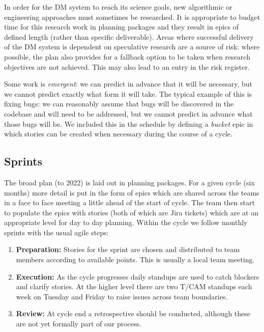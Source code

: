 In order for the DM system to reach its science goals, new algorithmic or engineering approaches must sometimes be researched.
It is appropriate to budget time for this research work in planning packages and they result in epics of defined length (rather than specific  deliverable).
Areas where successful delivery of the DM system is dependent on speculative research are a source of risk: where possible, the plan  also provides for a fallback option to be taken when research objectives are not achieved.
This may also lead to an entry in the risk register.\cite{2016SPIE.9911E..0NK}


Some work is \emph{emergent}: we can predict in advance that it will be necessary, but we cannot
predict exactly what form it will take. The typical example of this is fixing bugs: we can reasonably
assume that bugs will be discovered in the codebase and will need to be addressed,
but we cannot predict in advance what those bugs will be.
We included this in the schedule by defining a \emph{bucket} epic in which stories can be created
when necessary during the course of a cycle.

\subsection{Sprints} \label{sec:sprint} \label{sec:jira_ticket}
The broad plan (to 2022) is laid out in planning packages.
For a  given  cycle (six months)   more detail is put in the form of epics which  are shared across the teams in a face to face meeting a little ahead of the start of cycle.  The team then start to populate the epics with stories (both of which are Jira tickets)  which are at an appropriate level for day to day planning.
Within the cycle we follow monthly sprints with the usual agile steps:
\begin{enumerate}
\item \textbf{Preparation:} Stories for the sprint are chosen and distributed to team members according to available points. This is usually a local team meeting.
\item \textbf{Execution:} As the cycle progresses daily standups are used to catch blockers and clarify stories. At the higher level there are two T/CAM standups each week on Tuesday and Friday to raise issues across team boundaries.
\item \textbf{Review:} At cycle end a retrospective should be conducted, although these are not yet formally part of our process.
\end{enumerate}

